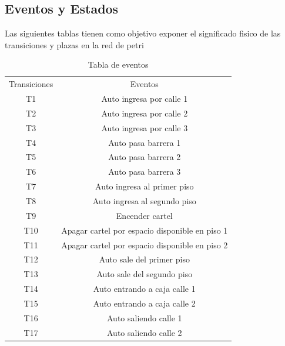 \documentclass{article}
\begin{document}
	\subsection{Eventos y Estados}
	Las siguientes tablas tienen como objetivo exponer el significado fisico de las transiciones y plazas en la red de petri
	\begin{table}[H]
		\begin{center}
		\begin{tabular}{ |c|c| } 
 			\hline
 			Transiciones & Eventos \\ 
 			T1 & Auto ingresa por calle 1 \\
 			T2 & Auto ingresa por calle 2 \\
 			T3 & Auto ingresa por calle 3 \\
 			T4 & Auto pasa barrera 1 \\
 			T5 & Auto pasa barrera 2 \\
 			T6 & Auto pasa barrera 3 \\ 
 			T7 & Auto ingresa al primer piso \\
 			T8 & Auto ingresa al segundo piso \\
 			T9 & Encender cartel \\
 			T10 & Apagar cartel por espacio disponible en piso 1 \\
 			T11 & Apagar cartel por espacio disponible en piso 2 \\
 			T12 & Auto sale del primer piso \\
 			T13 & Auto sale del segundo piso \\
 			T14 & Auto entrando a caja calle 1 \\
 			T15 & Auto entrando a caja calle 2 \\
 			T16 & Auto saliendo calle 1\\
 			T17 & Auto saliendo calle 2 \\ 
 			\hline
		\end{tabular}
		\end{center}
		\caption{Tabla de eventos}
		\label{table:eventos}
	\end{table}
	
\end{document}

